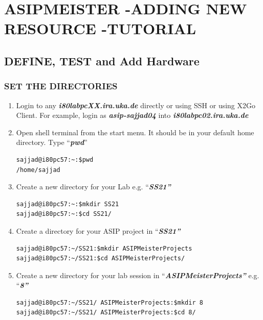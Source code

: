 \chapter*{ASIPMEISTER -ADDING NEW RESOURCE -TUTORIAL}
\section*{DEFINE, TEST and Add Hardware}
\subsection{SET THE DIRECTORIES}
\begin{enumerate}
\item Login to any \emph{\textbf{i80labpcXX.ira.uka.de}} directly or using SSH or using X2Go Client. For example, login as \emph{\textbf{asip-sajjad04}} into \emph{\textbf{i80labpc02.ira.uka.de}}
\item Open shell terminal from the start menu. It should be in your default home directory. Type ``\emph{\textbf{pwd}}''
\begin{lstlisting}
sajjad@i80pc57:~:$pwd
/home/sajjad
\end{lstlisting}
\item Create a new directory for your Lab e.g. ``\emph{\textbf{SS21''}}
\begin{lstlisting}
sajjad@i80pc57:~:$mkdir SS21
sajjad@i80pc57:~:$cd SS21/
\end{lstlisting}
\item Create a directory for your ASIP project in ``\emph{\textbf{SS21''}}
\begin{lstlisting}
sajjad@i80pc57:~/SS21:$mkdir ASIPMeisterProjects
sajjad@i80pc57:~/SS21:$cd ASIPMeisterProjects/
\end{lstlisting}
\item Create a new directory for your lab session in ``\emph{\textbf{ASIPMeisterProjects''}} e.g. ``\emph{\textbf{8''}}
\begin{lstlisting}
sajjad@i80pc57:~/SS21/ ASIPMeisterProjects:$mkdir 8
sajjad@i80pc57:~/SS21/ ASIPMeisterProjects:$cd 8/
\end{lstlisting}
\end{enumerate}

